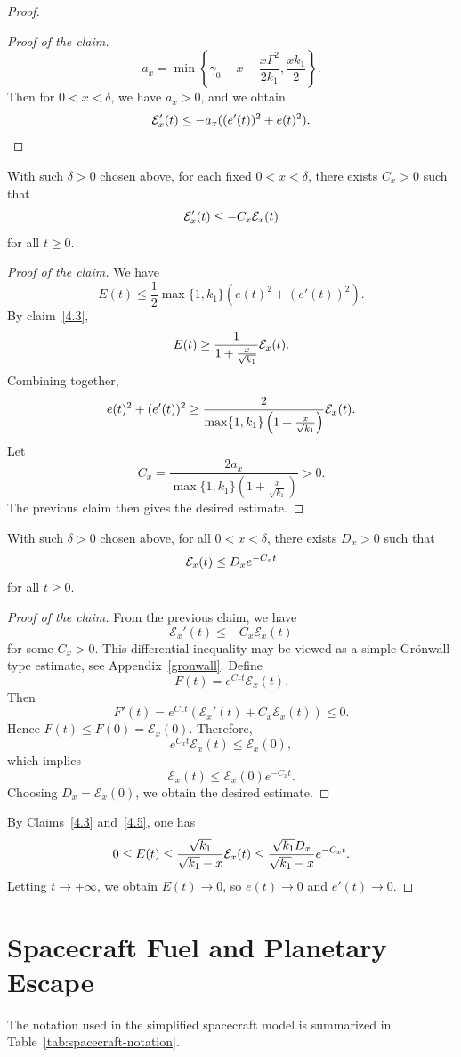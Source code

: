 ﻿\documentclass[12pt]{article}
\begin{document}
\begin{proof}
\begin{proof}[Proof of the claim]
\[ a_x = \min\left\{ \gamma_0 - x - \frac{x\Gamma^2}{2k_1}, \frac{xk_1}{2}\right\}.
\]
Then for $0 < x < \delta$, we have $a_x > 0$, and we obtain 
\[
 \mathcal{E}'_x(t) \leq - a_x((e'(t))^2 + e(t)^2).
\]
\end{proof}
\begin{claim}
   With such $\delta > 0$ chosen above, for each fixed $0 < x < \delta$, there exists $C_x > 0$ such that
    \[
 \mathcal{E}'_x(t) \leq - C_x\mathcal{E}_x(t)
 \]
    for all $t \geq 0$.
\end{claim}
\begin{proof}[Proof of the claim]
    We have
    \[
 E(t) \leq \frac{1}{2}\max\{1, k_1\}\left(e(t)^2 + (e'(t))^2\right).
 \]
    By claim~\ref{4.3},
    \[
 E(t) \geq \frac{1}{1 + \frac{x}{\sqrt{k_1}}}\mathcal{E}_x(t).
 \]
    Combining together,
    \[
 e(t)^2 + (e'(t))^2 \geq \frac{2}{\max\{1, k_1\}\left(1 + \frac{x}{\sqrt{k_1}}\right)}
 \mathcal{E}_x(t).
 \]
    Let
    \[
 C_x
 =
 \frac{2a_x}{\max\{1, k_1\}\left(1 + \frac{x}{\sqrt{k_1}}\right)}
 > 0.
 \]
    The previous claim then gives the desired estimate.
\end{proof}
    \begin{claim}\label{4.5}
    With such $\delta > 0$ chosen above, for all $0 < x < \delta$, there exists $D_x > 0$ such that 
    \[
 \mathcal{E}_x(t) \leq D_xe^{-C_x t}
 \]
    for all $t \geq 0$.
    \end{claim}
    \begin{proof}[Proof of the claim]
From the previous claim, we have
\[
 \mathcal E_x'(t)\le - C_x\mathcal E_x(t)
\]
for some $C_x > 0$. This differential inequality may be viewed as a simple Grönwall-type estimate, see Appendix~\ref{gronwall}. Define
\[
 F(t) = e^{C_xt}\mathcal E_x(t).
\]
Then
\[
 F'(t)
 =
 e^{C_xt}\left(\mathcal E_x'(t) + C_x\mathcal E_x(t)\right)
 \le 0.
\]
Hence $F(t)\le F(0) = \mathcal E_x(0)$. Therefore,
\[
 e^{C_xt}\mathcal E_x(t)\le \mathcal E_x(0),
\]
which implies
\[
 \mathcal E_x(t)\le \mathcal E_x(0)e^{-C_xt}.
\]
Choosing $D_x = \mathcal{E}_x(0)$, we obtain the desired estimate.
\end{proof}
By Claims~\ref{4.3} and~\ref{4.5}, one has
\[
 0 \leq E(t) \leq \frac{\sqrt{k_1}}{\sqrt{k_1} - x}\mathcal{E}_x(t) \leq \frac{\sqrt{k_1}D_x}{\sqrt{k_1} - x}e^{-C_xt}.
\]
Letting $t \to + \infty$, we obtain $E(t) \to 0$, so $e(t) \to 0$ and $e'(t) \to 0$.
\end{proof}
\section{Spacecraft Fuel and Planetary Escape}
The notation used in the simplified spacecraft model is summarized in Table~\ref{tab:spacecraft-notation}.
\end{document}
